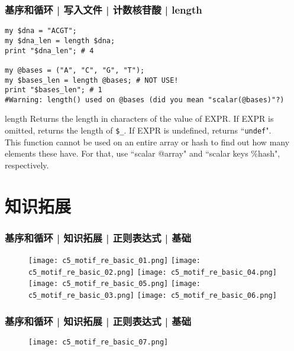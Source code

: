 \begin{frame}[fragile]
  \frametitle{基序和循环 | 写入文件 | 计数核苷酸 | \alert{length}}
  \vspace{-0.5em}
\begin{lstlisting}
my $dna = "ACGT";
my $dna_len = length $dna;
print "$dna_len"; # 4

my @bases = ("A", "C", "G", "T");
my $bases_len = length @bases; # NOT USE!
print "$bases_len"; # 1
#Warning: length() used on @bases (did you mean "scalar(@bases)"?)
\end{lstlisting}
\pause
\vspace{-0.5em}
\begin{block}{length}
{\small
Returns the length in characters of the value of EXPR. If EXPR is omitted, returns the length of \verb|$_|. If EXPR is undefined, returns ``\verb|undef|".\\
\vspace{0.2em}
This function cannot be used on an entire array or hash to find out how many elements these have. For that, use ``\alert{scalar @array}" and ``\alert{scalar keys \%hash}", respectively.
}
\end{block}
\end{frame}

\section{知识拓展}
\begin{frame}
  \frametitle{基序和循环 | 知识拓展 | 正则表达式 | \alert{基础}}
  \begin{figure}
    \centering
    \texttt{[image: c5\_motif\_re\_basic\_01.png]}
    \texttt{[image: c5\_motif\_re\_basic\_02.png]}
    \texttt{[image: c5\_motif\_re\_basic\_04.png]}\\
    \vspace{1.5em}
    \texttt{[image: c5\_motif\_re\_basic\_05.png]}
    \texttt{[image: c5\_motif\_re\_basic\_03.png]}
    \texttt{[image: c5\_motif\_re\_basic\_06.png]}
  \end{figure}
\end{frame}

\begin{frame}
  \frametitle{基序和循环 | 知识拓展 | 正则表达式 | \alert{基础}}
  \begin{figure}
    \centering
    \texttt{[image: c5\_motif\_re\_basic\_07.png]}
  \end{figure}
\end{frame}

